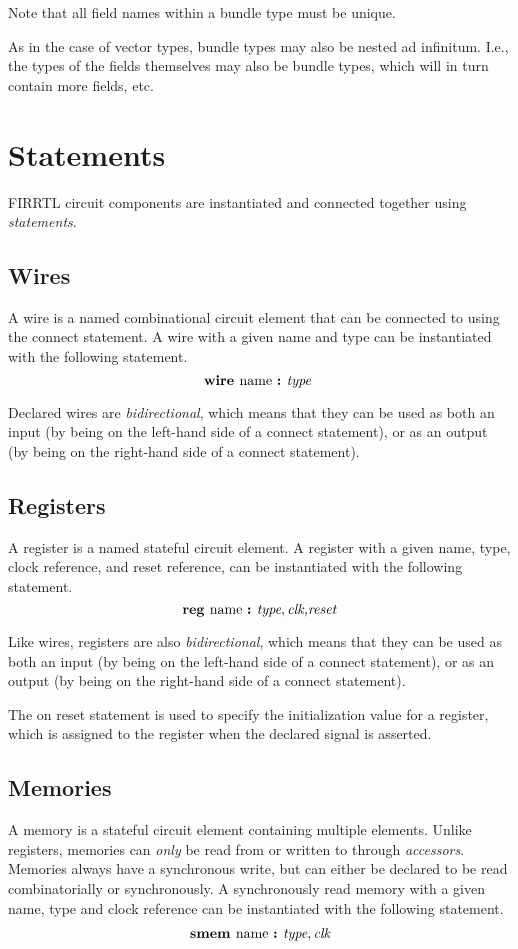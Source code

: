 \documentclass[12pt]{article}
\begin{document}
Note that all field names within a bundle type must be unique.

As in the case of vector types, bundle types may also be nested ad infinitum.
I.e., the types of the fields themselves may also be bundle types, which will in turn contain more fields, etc. 

\section{Statements} \label{statements}

FIRRTL circuit components are instantiated and connected together using {\em statements}.

\subsection{Wires}
A wire is a named combinational circuit element that can be connected to using the connect statement.
A wire with a given name and type can be instantiated with the following statement.
\[
\text{\bf wire\ } \text{name } \text{\bf :\ } \text{\em type\ } \\
\]

Declared wires are {\em bidirectional}, which means that they can be used as both an input (by being on the left-hand side of a connect statement), or as an output (by being on the right-hand side of a connect statement).

\subsection{Registers}
A register is a named stateful circuit element.
A register with a given name, type, clock reference, and reset reference, can be instantiated with the following statement.
\[
\text{\bf reg\ } \text{name } \text{\bf :\ } \text{\em type},\text{\em clk,} \text{\em reset} \\
\]

Like wires, registers are also {\em bidirectional}, which means that they can be used as both an input (by being on the left-hand side of a connect statement), or as an output (by being on the right-hand side of a connect statement). 

The on reset statement is used to specify the initialization value for a register, which is assigned to the register when the declared  signal is asserted.

\subsection{Memories}
A memory is a stateful circuit element containing multiple elements.
Unlike registers, memories can {\em only} be read from or written to through {\em accessors}.
Memories always have a synchronous write, but can either be declared to be read combinatorially or synchronously.
A synchronously read memory with a given name, type and clock reference can be instantiated with the following statement.
\[
\begin{aligned}
\text{\bf smem\ } \text{name } \text{\bf :\ } \text{\em type},\text{\em clk} \\
\end{aligned}
\]
\end{document}
